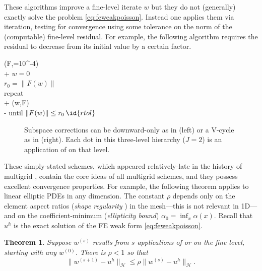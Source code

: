 \documentclass[letterpaper,final,12pt,reqno]{amsart}
\theoremstyle{claim}
\newtheorem*{theorem}{Theorem}
\numberwithin{equation}{section}
\numberwithin{figure}{section}
\numberwithin{table}{section}
\begin{document}
These  algorithms improve a fine-level iterate $w$ but they do not (generally) exactly solve the problem \eqref{eq:feweakpoisson}.  Instead one applies them via iteration, testing for convergence using some tolerance on the norm of the (computable) fine-level residual.  For example, the following algorithm requires the residual to decrease from its initial value by a certain factor.
\begin{pseudo*}
(F,=10^{-4})\text{:} \\+
    $w=0$ \qquad\qquad\qquad\qquad\qquad {} \\
    $r_0 = \|F(w)\|$ \\
    repeat \\+
        (w,F) \qquad\qquad {} \\-
    until $\|F(w)\| \le r_0\, \id{rtol}$
\end{pseudo*}

\begin{figure}

\caption{Subspace corrections can be downward-only as in  (left) or a V-cycle as in  (right).  Each dot in this three-level hierarchy ($J=2$) is an application of  on that level.}
\label{fig:msccycles}
\end{figure}

These simply-stated schemes, which appeared relatively-late in the history of multigrid \cite{Xu1992}, contain the core ideas of all multigrid schemes, and they possess excellent convergence properties.  For example, the following theorem applies to linear elliptic PDEs in any dimension.  The constant $\rho$ depends only on the element aspect ratios (\emph{shape regularity} \cite{Elmanetal2014}) in the mesh---this is not relevant in 1D---and on the coefficient-minimum (\emph{ellipticity bound}) $\alpha_0=\inf_x \alpha(x)$.  Recall that $u^h$ is the exact solution of the FE weak form \eqref{eq:feweakpoisson}.

\begin{theorem} \cite[Thm.~3.10]{GraeserKornhuber2009}  Suppose $w^{(s)}$  results from $s$ applications of  or  on the fine level, starting with any $w^{(0)}$.  There is $\rho<1$ so that
\begin{equation}
  \|w^{(s+1)} - u^h\|_{\mathcal{H}} \le \rho \|w^{(s)} - u^h\|_{\mathcal{H}}.  \label{eq:mscconvergence}
\end{equation}
\end{theorem}
\end{document}
